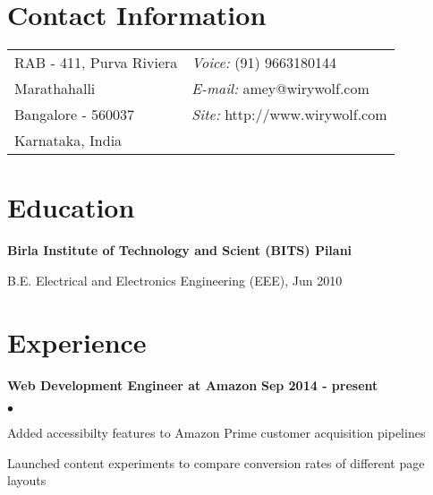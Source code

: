 \documentclass[margin,line]{res}
\newenvironment{list1}{
  \begin{list}{\ding{113}}{%
      \setlength{\itemsep}{0in}
      \setlength{\parsep}{0in} \setlength{\parskip}{0in}
      \setlength{\topsep}{0in} \setlength{\partopsep}{0in}
      \setlength{\leftmargin}{0.17in}}}{\end{list}}
\newenvironment{list2}{
  \begin{list}{$\bullet$}{%
      \setlength{\itemsep}{0in}
      \setlength{\parsep}{0in} \setlength{\parskip}{0in}
      \setlength{\topsep}{0in} \setlength{\partopsep}{0in}
      \setlength{\leftmargin}{0.2in}}}{\end{list}}
\begin{document}

\begin{resume}
\section{\sc Contact Information}
\vspace{.05in}
\begin{tabular}{@{}p{2in}p{4in}}
RAB - 411, Purva Riviera                & {\it Voice:}  (91) 9663180144 \\
Marathahalli                                    & {\it E-mail:}  amey@wirywolf.com \\
Bangalore - 560037                              & {\it Site:} http://www.wirywolf.com \\
Karnataka, India
\end{tabular}


\section{\sc Education}
{\bf Birla Institute of Technology and Scient (BITS) Pilani} \\
\vspace*{-.1in}
\begin{list1}
\item[] B.E. Electrical and Electronics Engineering (EEE), Jun 2010
\end{list1}

\section{\sc Experience}

{\bf Web Development Engineer at Amazon} \hfill {\bf Sep 2014 - present}\\
\begin{list2}
\item Added accessibilty features to Amazon Prime customer acquisition pipelines
\item Launched content experiments to compare conversion rates of different page layouts
\end{list2}


\end{resume}
\end{document}
